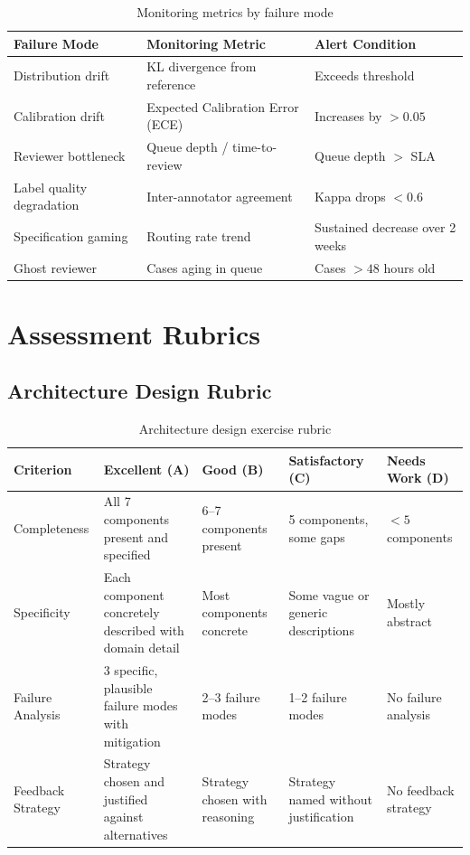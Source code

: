\begin{table}[htbp]
\caption{Monitoring metrics by failure mode}
\label{tab:monitoring-metrics}
\centering
\begin{tabular}{@{}p{3.5cm}p{3.5cm}p{4cm}@{}}
\toprule
\textbf{Failure Mode} & \textbf{Monitoring Metric} & \textbf{Alert Condition} \\
\midrule
Distribution drift & KL divergence from reference & Exceeds threshold \\
Calibration drift & Expected Calibration Error (ECE) & Increases by $>0.05$ \\
Reviewer bottleneck & Queue depth / time-to-review & Queue depth $>$ SLA \\
Label quality degradation & Inter-annotator agreement & Kappa drops $<0.6$ \\
Specification gaming & Routing rate trend & Sustained decrease over 2 weeks \\
Ghost reviewer & Cases aging in queue & Cases $>48$ hours old \\
\bottomrule
\end{tabular}
\end{table}

\section{Assessment Rubrics}

\subsection{Architecture Design Rubric}

\begin{table}[htbp]
\caption{Architecture design exercise rubric}
\label{tab:arch-design-rubric}
\centering
\begin{tabular}{@{}p{3cm}p{2.5cm}p{2.5cm}p{2.5cm}p{2.5cm}@{}}
\toprule
\textbf{Criterion} & \textbf{Excellent (A)} & \textbf{Good (B)} & \textbf{Satisfactory (C)} & \textbf{Needs Work (D)} \\
\midrule
Completeness & All 7 components present and specified & 6--7 components present & 5 components, some gaps & $<5$ components \\
Specificity & Each component concretely described with domain detail & Most components concrete & Some vague or generic descriptions & Mostly abstract \\
Failure Analysis & 3 specific, plausible failure modes with mitigation & 2--3 failure modes & 1--2 failure modes & No failure analysis \\
Feedback Strategy & Strategy chosen and justified against alternatives & Strategy chosen with reasoning & Strategy named without justification & No feedback strategy \\
\bottomrule
\end{tabular}
\end{table}

